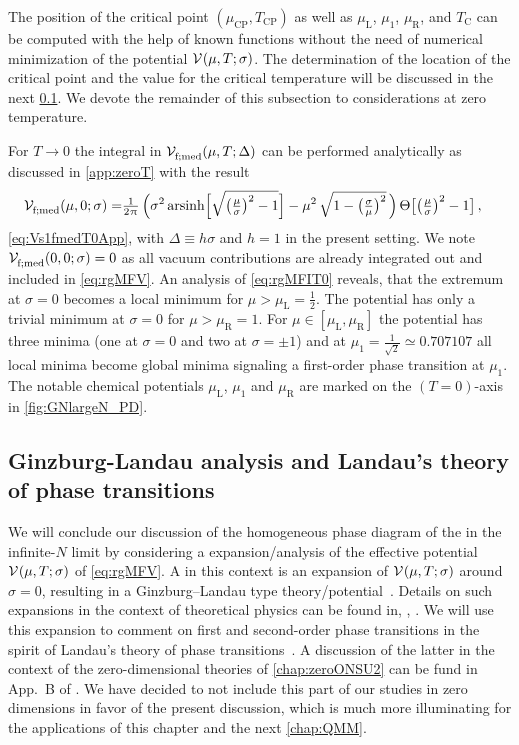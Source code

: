 The position of the critical point $(\mu_{\mathrm{CP}},T_{\mathrm{CP}})$ as well as $\mu_\mathrm{L}$, $\mu_1$, $\mu_\mathrm{R}$, and $T_\mathrm{C}$ can be computed with the help of known functions without the need of numerical minimization of the potential $\VeffArgs{\muT;\sigma}$.
The determination of the location of the critical point and the value for the critical temperature will be discussed in the next \cref{subsec:GNGL}.
We devote the remainder of this subsection to considerations at zero temperature.

For $T \rightarrow 0$ the integral in $\VeffArgs[\mathrm{f};\med]{\muT;\Delta}$ can be performed analytically \dash{} as discussed in \cref{app:zeroT} \dash{} with the result
\begin{align}
	\VeffArgs[\mathrm{f};\med]{\mu,0;\sigma}=&	\tfrac{1}{2\piu} \, \Big( \sigma^2 \, \mathrm{arsinh} \Big[ \sqrt{ \big( \tfrac{\mu}{\sigma} \big)^2 - 1 } \Big] -\mu^2 \, \sqrt{1 - \big( \tfrac{\sigma}{\mu} \big)^2 } \,\Big) \, \Theta \big[ \big( \tfrac{\mu}{\sigma} \big)^2 - 1 \big] \, ,	\label{eq:rgMFIT0}
\end{align}
\cf{} \cref{eq:Vs1fmedT0App}, with $\Delta\equiv h \sigma$ and $h=1$ in the present setting.
We note $\VeffArgs[\mathrm{f};\med]{0,0;\sigma} = 0$ as all vacuum contributions are already integrated out and included in \cref{eq:rgMFV}.
An analysis of \cref{eq:rgMFIT0} reveals, that the extremum at $\sigma = 0$ becomes a local minimum for $\mu > \mu_\mathrm{L} = \tfrac{1}{2}$.
The potential has only a trivial minimum at $\sigma = 0$ for $\mu > \mu_\mathrm{R} = 1$.
For ${\mu \in [ \mu_\mathrm{L}, \mu_\mathrm{R} ]}$ the potential has three minima (one at $\sigma = 0$ and two at $\sigma = \pm 1$) and at $\mu_1 = \tfrac{1}{\sqrt{2}} \simeq 0.707107$ all local minima become global minima signaling a first-order phase transition at $\mu_1$.
The notable chemical potentials $\mu_\mathrm{L}$, $\mu_1$ and $\mu_\mathrm{R}$ are marked on the $(T=0)$-axis in \cref{fig:GNlargeN_PD}.

\subsection{Ginzburg-Landau analysis and Landau’s theory of phase transitions}\label{subsec:GNGL}
We will conclude our discussion of the homogeneous phase diagram of the \gnm{} in the infinite-$N$ limit by considering a  expansion/analysis of the effective potential $\VeffArgs{\muT;\sigma}$ of \cref{eq:rgMFV}.
A \gla{} in this context is an expansion of $\VeffArgs{\muT;\sigma}$ around $\sigma=0$, resulting in a Ginzburg–Landau type theory/potential~\cite{Ginzburg:1950sr}.
Details on such expansions in the context of theoretical physics can be found in, \eg{}, \ccite{\glRefs}.
We will use this expansion to comment on first and second-order phase transitions in the spirit of Landau’s theory of phase transitions~\cite{Landau:1937obd}.
A discussion of the latter in the context of the zero-dimensional theories of \cref{chap:zeroONSU2} can be fund in App.~B of .
We have decided to not include this part of our studies in zero dimensions in favor of the present discussion, which is much more illuminating for the applications of this chapter and the next \cref{chap:QMM}.\bigskip

